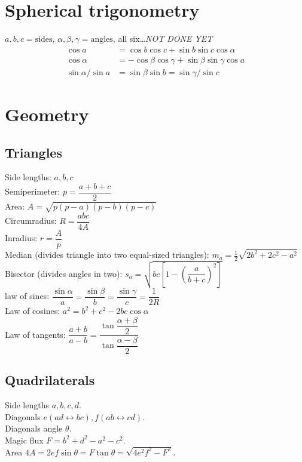 \section{Spherical trigonometry}
$a,b,c=\text{sides}$, $\alpha,\beta,\gamma=\text{angles}$, all
six\ldots \emph{NOT DONE YET}
\begin{align*}
\cos a&{}=\cos b \cos c + \sin b \sin c \cos \alpha\\
\cos \alpha&{}=-\cos\beta \cos\gamma + \sin\beta\sin\gamma\cos a\\
\sin \alpha/\sin a&{}=\sin\beta\sin b=\sin\gamma/\sin c
\end{align*}

\section{Geometry}

\subsection{Triangles}
Side lengths: $a,b,c$\\
Semiperimeter: $p=\dfrac{a+b+c}{2}$\\
Area: $A=\sqrt{p(p-a)(p-b)(p-c)}$\\
Circumradius: $R=\dfrac{abc}{4A}$\\
Inradius: $r=\dfrac{A}{p}$\\
Median (divides triangle into two equal-sized triangles): $m_a=\tfrac{1}{2}\sqrt{2b^2+2c^2-a^2}$\\
Bisector (divides angles in two): $s_a=\sqrt{bc\left[1-\left(\dfrac{a}{b+c}\right)^2\right]}$\\
law of sines: $\dfrac{\sin\alpha}{a}=\dfrac{\sin\beta}{b}=\dfrac{\sin\gamma}{c}=\dfrac{1}{2R}$\\
Law of cosines: $a^2=b^2+c^2-2bc\cos\alpha$\\
Law of tangents: $\dfrac{a+b}{a-b}=\dfrac{\tan\dfrac{\alpha+\beta}{2}}{\tan\dfrac{\alpha-\beta}{2}}$\\

\subsection{Quadrilaterals}
Side lengths $a,b,c,d$.\\
Diagonals $e(ad\leftrightarrow bc), f(ab\leftrightarrow cd)$.\\
Diagonals angle $\theta$.\\
Magic flux $F=b^2+d^2-a^2-c^2$.\\
Area $4A=2ef\sin\theta=F\tan\theta=\sqrt{4e^2f^2-F^2}$.


